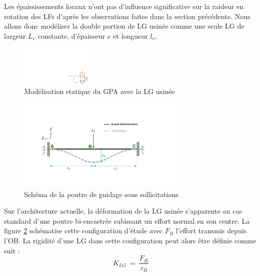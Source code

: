 Les épaississements locaux n'ont pas d'influence significative sur la raideur en rotation des LFs d'après les observations faites dans la section précédente. Nous allons donc modéliser la double portion de LG usinée comme une seule LG de largeur $L_v$ constante, d'épaisseur $e$ et longueur $l_v$. 
\begin{figure}[!htbp]
\begin{center}
    \captionsetup{justification=centering}
	\includegraphics[trim={23.5cm 0cm 0cm 12cm}, clip,width=0.3\textwidth]{../Chap3/Figure/KGPA_Kv2.pdf}
	\caption{Modélisation statique du GPA avec la LG usinée}
	\label{fig:KGPA_Kv}
\end{center}	
\end{figure}
\begin{figure}[!htbp]
\begin{center}
    \captionsetup{justification=centering}
	\includegraphics[trim={4cm 3cm 6.5cm 4.5cm},clip, width=0.7\textwidth]{../Chap3/Figure/Kv_modele2.pdf}
	\caption{Schéma de la poutre de guidage sous sollicitations}
	\label{fig:Kv_modele}
\end{center}	
\end{figure}

Sur l'architecture actuelle, la déformation de la LG usinée s'apparente au cas standard d'une poutre bi-encastrée subissant un effort normal en son centre. La figure \ref{fig:Kv_modele} schématise cette configuration d'étude avec $F_B$ l'effort transmis depuis l'OB. La rigidité d'une LG dans cette configuration peut alors être définie comme suit :
\begin{equation}
K_{LG}\ =\ \frac{F_B}{z_B}
\label{eq:def_Kv}
\end{equation}

